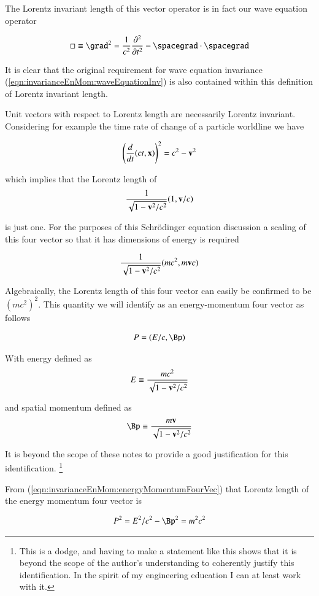 The Lorentz invariant length of this vector operator is in fact our wave equation operator

\begin{align}
\square \equiv \grad^2 = \inv{c^2}\frac{\partial^2}{\partial t^2} - \spacegrad \cdot \spacegrad
\end{align}

It is clear that the original requirement for wave equation invariance (\ref{eqn:invarianceEnMom:waveEquationInv}) is also contained within 
this definition of Lorentz invariant length.

Unit vectors with respect to Lorentz length are necessarily Lorentz invariant.  Considering for example the time rate of change of
a particle worldline we have

\begin{align}
\left(\frac{d}{dt}(ct, \mathbf{x}) \right)^2 = c^2 - \mathbf{v}^2
\end{align}

which implies that the Lorentz length of
\begin{align}
\frac{1}{\sqrt{1 - \mathbf{v}^2/c^2}}(1, \mathbf{v}/c)
\end{align}

is just one.  For the purposes of this 
Schr\"{o}dinger equation
discussion a scaling of this four vector so that it has dimensions of energy is required

\begin{align}
\frac{1}{\sqrt{1 - \mathbf{v}^2/c^2}}(m c^2, m\mathbf{v} c)
\end{align}

Algebraically, the Lorentz length of this four vector can easily be confirmed to be $(m c^2)^2$.  This quantity 
we will identify as an energy-momentum four vector as follows

\begin{align}\label{eqn:invarianceEnMom:energyMomentumFourVec}
P = (E/c, \Bp)
\end{align}

With energy defined as
\begin{align}
E \equiv \frac{m c^2}{\sqrt{1 - \mathbf{v}^2/c^2}}
\end{align}

and spatial momentum defined as
\begin{align}
\Bp \equiv \frac{m \Bv}{\sqrt{1 - \Bv^2/c^2}}
\end{align}

It is beyond the scope of these notes to provide a good justification for this identification.
\footnote{This is a dodge, and having to make a statement like this shows that it is beyond the scope of the author's understanding to coherently justify this identification.  In the spirit of my engineering education I can at least work with it.}

From (\ref{eqn:invarianceEnMom:energyMomentumFourVec}) that Lorentz length of the
energy momentum four vector is

\begin{align}
P^2 = E^2/c^2 - \Bp^2 = m^2 c^2
\end{align}

%
%

%
